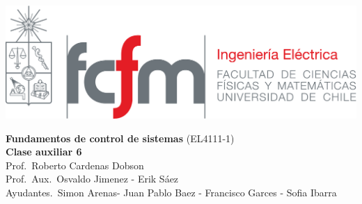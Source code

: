 \documentclass[
  11pt,
  letterpaper,
   addpoints,
  ]{exam}
\begin{document}
\noindent
\begin{minipage}{0.47\textwidth}
\includegraphics[width=\textwidth]{../fcfm_die}
\end{minipage}
\begin{minipage}{0.53\textwidth}
\begin{center} 
\large\textbf{Fundamentos de control de sistemas} (EL4111-1) \\
\large\textbf{Clase auxiliar 6} \\
\small Prof.~Roberto Cardenas Dobson\\
\small Prof.~Aux.~Osvaldo Jimenez - Erik Sáez\\
\small Ayudantes.~Simon Arenas- Juan Pablo Baez - Francisco Garces - Sofia Ibarra\\
\end{center}
\end{minipage}

\vspace{0.5cm}
\noindent
\vspace{.85cm}
\end{document}
